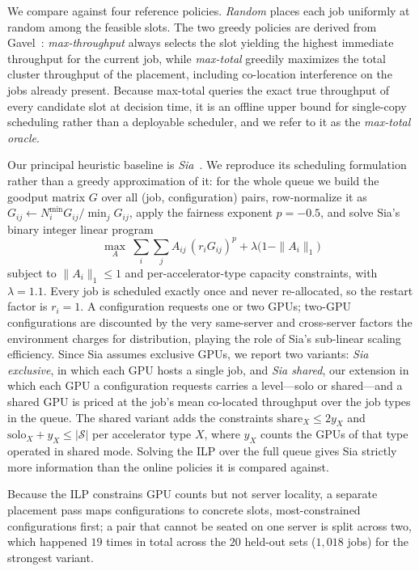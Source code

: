 \documentclass{article}
\begin{document}
We compare against four reference policies.  \emph{Random} places each job uniformly at random among the feasible slots.  The two greedy policies are derived from Gavel~\cite{gavel}: \emph{max-throughput} always selects the slot yielding the highest immediate throughput for the current job, while \emph{max-total} greedily maximizes the total cluster throughput of the placement, including co-location interference on the jobs already present.  Because max-total queries the exact true throughput of every candidate slot at decision time, it is an offline upper bound for single-copy scheduling rather than a deployable scheduler, and we refer to it as the \emph{max-total oracle}.

Our principal heuristic baseline is \emph{Sia}~\cite{zhong2023sia}.  We reproduce its scheduling formulation rather than a greedy approximation of it: for the whole queue we build the goodput matrix $G$ over all (job, configuration) pairs, row-normalize it as $G_{ij} \leftarrow N_i^{\min} G_{ij} / \min_j G_{ij}$, apply the fairness exponent $p = -0.5$, and solve Sia's binary integer linear program
\begin{equation}
    \max_{A}\ \sum_{i}\sum_{j} A_{ij}\,(r_i G_{ij})^{p} + \lambda\bigl(1 - \|A_i\|_1\bigr)
    \label{eq:sia}
\end{equation}
subject to $\|A_i\|_1 \le 1$ and per-accelerator-type capacity constraints, with $\lambda = 1.1$.  Every job is scheduled exactly once and never re-allocated, so the restart factor is $r_i = 1$.  A configuration requests one or two GPUs; two-GPU configurations are discounted by the very same-server and cross-server factors the environment charges for distribution, playing the role of Sia's sub-linear scaling efficiency.  Since Sia assumes exclusive GPUs, we report two variants: \emph{Sia exclusive}, in which each GPU hosts a single job, and \emph{Sia shared}, our extension in which each GPU a configuration requests carries a level---solo or shared---and a shared GPU is priced at the job's mean co-located throughput over the job types in the queue.  The shared variant adds the constraints $\text{share}_X \le 2 y_X$ and $\text{solo}_X + y_X \le |\mathcal{S}|$ per accelerator type $X$, where $y_X$ counts the GPUs of that type operated in shared mode.  Solving the ILP over the full queue gives Sia strictly more information than the online policies it is compared against.

Because the ILP constrains GPU counts but not server locality, a separate placement pass maps configurations to concrete slots, most-constrained configurations first; a pair that cannot be seated on one server is split across two, which happened $19$ times in total across the $20$ held-out sets ($1{,}018$ jobs) for the strongest variant.
\end{document}
